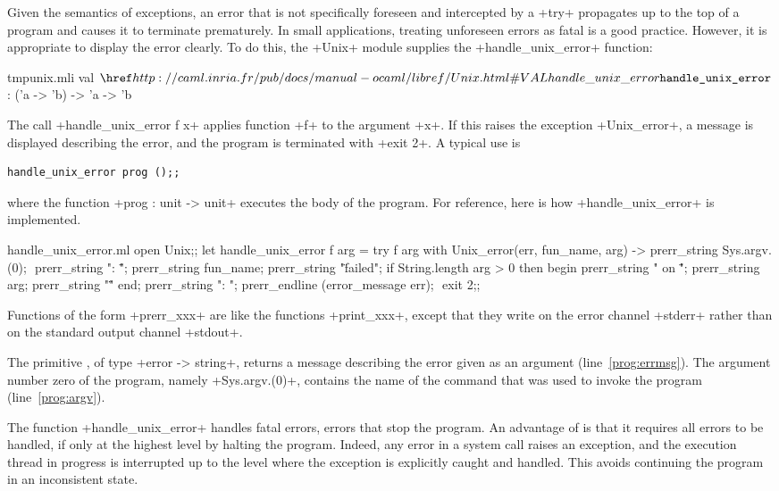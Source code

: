 Given the semantics of exceptions, an error that is not specifically
foreseen and intercepted by a \ml+try+ propagates up to the top of a
program and causes it to terminate prematurely.  In small
applications, treating unforeseen errors as fatal is a good practice.
However, it is appropriate to display the error clearly. To do this,
the \ml+Unix+ module supplies the \ml+handle_unix_error+ function:
%
\begin{listingcodefile}{tmpunix.mli}
val $\indexlibvalue{Unix}{handle\_unix\_error}$ : ('a -> 'b) -> 'a -> 'b
\end{listingcodefile}
%
The call  \ml+handle_unix_error f x+ applies function  \ml+f+ to the
argument \ml+x+. If this raises the exception \ml+Unix_error+, a
message is displayed describing the error, and the program is
terminated with  \ml+exit 2+. A typical use is
%
\begin{lstlisting}
handle_unix_error prog ();;
\end{lstlisting}
% 
where the function \ml+prog : unit -> unit+ executes the body of the
program. For reference, here is how \ml+handle_unix_error+ is
implemented.
%
\begin{listingcodefile}[style=numbers]{handle_unix_error.ml}
open Unix;;
let handle_unix_error f arg =
  try
    f arg
  with Unix_error(err, fun_name, arg) ->
    prerr_string Sys.argv.(0); $\label{prog:argv}$
    prerr_string ": \"";
    prerr_string fun_name;
    prerr_string "\" failed";
    if String.length arg > 0 then begin
      prerr_string " on \"";
      prerr_string arg;
      prerr_string "\""
    end;
    prerr_string ": ";
    prerr_endline (error_message err); $\label{prog:errmsg}$
    exit 2;;
\end{listingcodefile}
% 
Functions of the form \ml+prerr_xxx+ are like the functions
\ml+print_xxx+, except that they write on the error channel
\ml+stderr+ rather than on the standard output channel \ml+stdout+.

The primitive , of type 
\ml+error -> string+, returns a message describing the error given as an
argument (line~\ref{prog:errmsg}). The argument number zero of the
program, namely \ml+Sys.argv.(0)+, contains the name of the command
that was used to invoke the program (line~\ref{prog:argv}).

The function \ml+handle_unix_error+ handles fatal errors, \ie{} errors
that stop the program.  An advantage of {\ocaml} is that it requires
all errors to be handled, if only at the highest level by
halting the program. Indeed, any error in a system call raises an
exception, and the execution thread in progress is interrupted up to
the level where the exception is explicitly caught and handled. This avoids
continuing the program in an inconsistent state.


